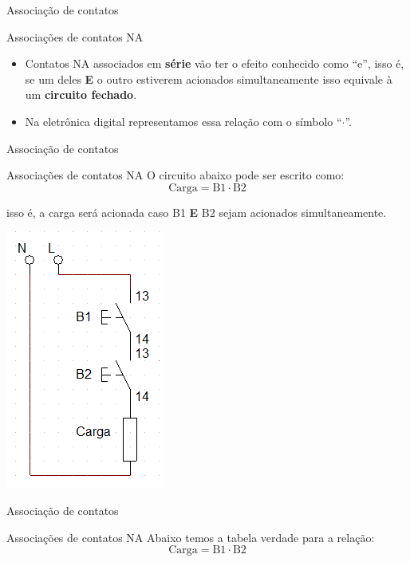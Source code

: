 \begin{frame}{Associação de contatos}
\begin{block}{Associações de contatos NA}
\begin{itemize}
    \item Contatos NA associados em \textbf{série} vão ter o efeito conhecido como ``e'', isso é, se um deles \textbf{E} o outro estiverem acionados simultaneamente isso equivale à um \textbf{circuito fechado}.
    \item Na eletrônica digital representamos essa relação com o símbolo ``$ \cdot $''.
\end{itemize}
\end{block}
\end{frame}

\begin{frame}{Associação de contatos}
\begin{block}{Associações de contatos NA}
	O circuito abaixo pode ser escrito como:
	$$ \text{Carga} = \text{B}1\cdot \text{B}2 $$
	
	 isso é, a carga será acionada caso B1 \textbf{E} B2 sejam acionados simultaneamente.
\end{block}

\centerline{\includegraphics[height=0.5\textheight]{Figuras/Ch06/fig5.jpg}}
\end{frame}

\begin{frame}{Associação de contatos}
\begin{block}{Associações de contatos NA}
	Abaixo temos a tabela verdade para a relação:
	$$ \text{Carga} = \text{B}1\cdot \text{B}2 $$
\end{block}

\vspace{0.3cm}

\begin{table}[h]
\end{table}
\end{frame}


